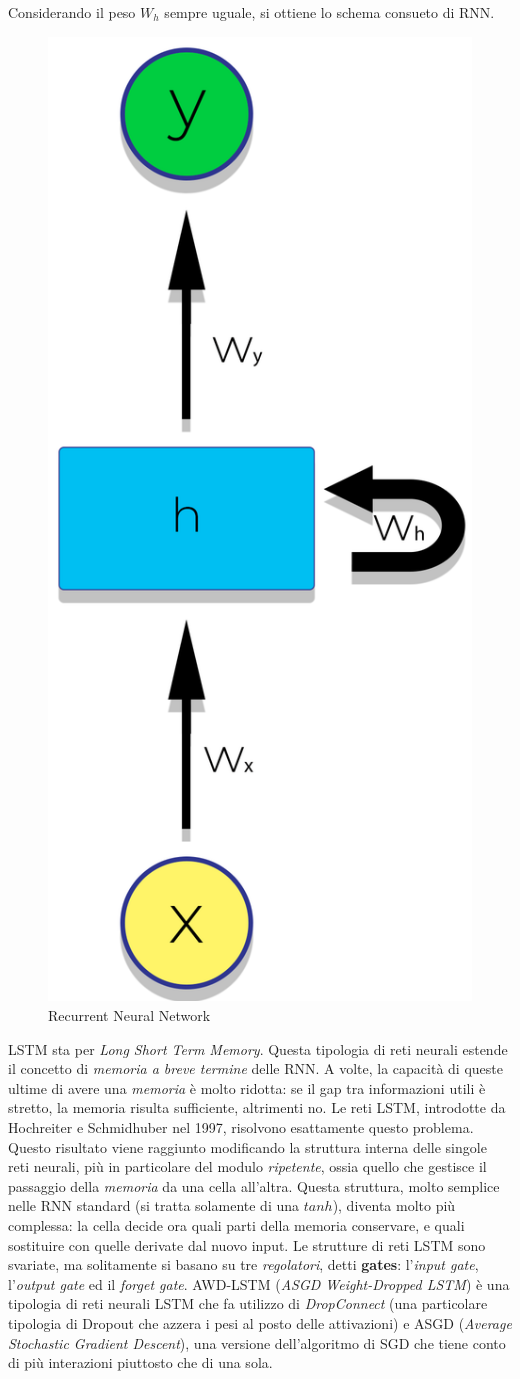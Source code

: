 Considerando il peso $W_h$ sempre uguale, si ottiene lo schema consueto di RNN.
\begin{figure}[H]
    \begin{center}
        \includegraphics[width=0.3\columnwidth]{images/fallback/folded-RNN.png}
    \end{center}
    \caption{Recurrent Neural Network}
    \label{fig:folded-RNN}
\end{figure}
LSTM sta per \textit{Long Short Term Memory}. Questa tipologia di reti neurali estende il concetto di \textit{memoria a breve termine} delle RNN. A volte, la capacità di queste ultime di avere una \textit{memoria} è molto ridotta: se il gap tra informazioni utili è stretto, la memoria risulta sufficiente, altrimenti no. Le reti LSTM, introdotte da Hochreiter e Schmidhuber nel 1997\cite{paper:hochreiter1997long}, risolvono esattamente questo problema. Questo risultato viene raggiunto modificando la struttura interna delle singole reti neurali, più in particolare del modulo \textit{ripetente}, ossia quello che gestisce il passaggio della \textit{memoria} da una cella all'altra. Questa struttura, molto semplice nelle RNN standard (si tratta solamente di una $tanh$), diventa molto più complessa: la cella decide ora quali parti della memoria conservare, e quali sostituire con quelle derivate dal nuovo input. Le strutture di reti LSTM sono svariate, ma solitamente si basano su tre \textit{regolatori}, detti \textbf{gates}: l'\textit{input gate}, l'\textit{output gate} ed il \textit{forget gate}. AWD-LSTM (\textit{ASGD Weight-Dropped LSTM}) è una tipologia di reti neurali LSTM che fa utilizzo di \textit{DropConnect} (una particolare tipologia di Dropout che azzera i pesi al posto delle attivazioni) e ASGD (\textit{Average Stochastic Gradient Descent}), una versione dell'algoritmo di SGD che tiene conto di più interazioni piuttosto che di una sola.
